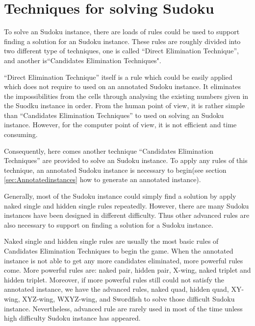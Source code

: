\documentclass[11pt]{report}
\begin{document}
\chapter{Techniques for solving Sudoku}
\label{sec:Techniques}

To solve an Sudoku instance, there are loads of rules could be used to support finding a solution for an Sudoku instance. These rules are roughly divided into two different type of techniques, one is called “Direct Elimination Technique”, and another is“Candidates Elimination Techniques".

``Direct Elimination Technique'' itself is a rule which could be easily applied which does not require to used on an annotated Sudoku instance. It eliminates the impossibilities from the cells through analysing the existing numbers given in the Suodku instance in order. From the human point of view, it is rather simple than ``Candidates Elimination Techniques'' to used on solving an Sudoku instance. However, for the computer point of view, it is not efficient and time consuming.

Consequently, here comes another technique ``Candidates Elimination Techniques'' are provided to solve an Sudoku instance. To apply any rules of this technique, an annotated Sudoku instance is necessary to begin(see section \ref{sec:Annotatedinstances} how to generate an annotated instance). 

Generally, most of the Sudoku instance could simply find a solution by apply naked single and hidden single rules repeatedly. However, there are many Sudoku instances have been designed in different difficulty. Thus other advanced rules are also necessary to support on finding a solution for a Sudoku instance.

Naked single and hidden single rules are usually the most basic rules of Candidates Elimination Techniques to begin the game. When the annotated instance is not able to get any more candidates eliminated, more powerful rules come. More powerful rules are: naked pair, hidden pair, X-wing, naked triplet and hidden triplet. Moreover, if more powerful rules still could not satisfy the annotated instance, we have the advanced rules, naked quad, hidden quad, XY-wing, XYZ-wing, WXYZ-wing, and Swordfish to solve those difficult Sudoku instance. Nevertheless, advanced rule are rarely used in most of the time unless high difficulty Sudoku instance has appeared.
\end{document}
